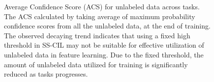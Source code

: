 \begin{figure}[htbp]
{
    }
    \caption{Average Confidence Score (ACS) for unlabeled data across tasks. The ACS calculated by taking average of maximum probability confidence scores from all the unlabeled data, at the end of training. The observed decaying trend indicates that using a fixed high threshold in SS-CIL may not be suitable for effective utilization of unlabeled data in feature learning. Due to the fixed threshold, the amount of unlabeled data utilized for training is significantly reduced as tasks progresses.}
    \label{fig:avg_confidence_score}
\end{figure}